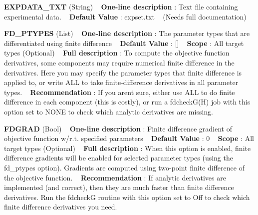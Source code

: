 \begin{DoxyItemize}
\item {\bfseries  E\+X\+P\+D\+A\+T\+A\+\_\+\+T\+XT } (String) ~\newline
{\bfseries  One-\/line description }\+: Text file containing experimental data. ~\newline
{\bfseries  Default Value }\+: expset.\+txt ~\newline
(Needs full documentation)\end{DoxyItemize}
\begin{DoxyItemize}
\item {\bfseries  F\+D\+\_\+\+P\+T\+Y\+P\+ES } (List) ~\newline
{\bfseries  One-\/line description }\+: The parameter types that are differentiated using finite difference ~\newline
{\bfseries  Default Value }\+: \mbox{[}\mbox{]} ~\newline
{\bfseries  Scope }\+: All target types (Optional) ~\newline
{\bfseries  Full description }\+: To compute the objective function derivatives, some components may require numerical finite difference in the derivatives. Here you may specify the parameter types that finite difference is applied to, or write \textquotesingle{}A\+LL\textquotesingle{} to take finite-\/difference derivatives in all parameter types. ~\newline
{\bfseries  Recommendation }\+: If you aren\textquotesingle{}t sure, either use \textquotesingle{}A\+LL\textquotesingle{} to do finite difference in each component (this is costly), or run a fdcheck\+G(\+H) job with this option set to \textquotesingle{}N\+O\+NE\textquotesingle{} to check which analytic derivatives are missing.\end{DoxyItemize}
\begin{DoxyItemize}
\item {\bfseries  F\+D\+G\+R\+AD } (Bool) ~\newline
{\bfseries  One-\/line description }\+: Finite difference gradient of objective function w/r.\+t. specified parameters ~\newline
{\bfseries  Default Value }\+: 0 ~\newline
{\bfseries  Scope }\+: All target types (Optional) ~\newline
{\bfseries  Full description }\+: When this option is enabled, finite difference gradients will be enabled for selected parameter types (using the fd\+\_\+ptypes option). Gradients are computed using two-\/point finite difference of the objective function. ~\newline
{\bfseries  Recommendation }\+: If analytic derivatives are implemented (and correct), then they are much faster than finite difference derivatives. Run the \textquotesingle{}fdcheckG\textquotesingle{} routine with this option set to Off to check which finite difference derivatives you need.\end{DoxyItemize}
